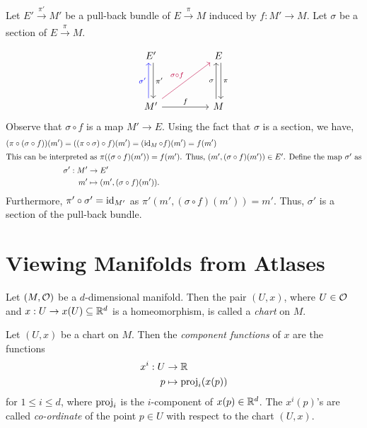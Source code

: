 \begin{remark}
	Let \(E' \xrightarrow[]{\ \pi'\ } M'\) be a pull-back bundle of \(E \xrightarrow[]{\ \pi\ } M\) induced by \(f: M' \to M\). Let \(\sigma\) be a section of \(E \xrightarrow[]{\ \pi\ } M\).
	\begin{equation*}
		\begin{tikzcd}
			E' \arrow[dd, shift left, "\pi'"] & & E \arrow[dd, shift left, "\pi"] \\
			& & \\
			M' \arrow[uu, blue, shift left, "\sigma'"] \arrow[rr, "f"] \arrow[rruu, purple, "\sigma \circ f"] & & M \arrow[uu, shift left, "\sigma"]
		\end{tikzcd}
	\end{equation*}
	Observe that \(\sigma \circ f\) is a map \(M' \to E\). Using the fact that \(\sigma\) is a section, we have,
	\begin{gather}
		(\pi \circ (\sigma \circ f))(m') = ((\pi \circ \sigma) \circ f)(m') = (\operatorname{id}_{M} \circ f)(m') = f(m') \nonumber \\
		\intertext{This can be interpreted as \(\pi((\sigma \circ f)(m')) = f(m')\). Thus, \((m', (\sigma \circ f)(m')) \in E'\). Define the map \(\sigma'\) as}
		\begin{aligned}
			\sigma': M' & \to E'                              \\
			m'          & \mapsto (m', (\sigma \circ f)(m')).
		\end{aligned}
	\end{gather}
	Furthermore, \(\pi' \circ \sigma' = \operatorname{id}_{M'}\) as \(\pi'(m', (\sigma \circ f)(m')) = m'\). Thus, \(\sigma'\) is a section of the pull-back bundle.
\end{remark}

\section{Viewing Manifolds from Atlases}

\begin{definition}[Chart]\label{def:chart}
	Let \((M, \mathcal{O})\) be a \(d\)-dimensional manifold. Then the pair \((U, x)\), where \(U \in \mathcal{O}\) and \(x: U \to x(U) \subseteq \mathbb R^d\) is a homeomorphism, is called a \emph{chart} on \(M\).
\end{definition}

\begin{remark}\label{rem:component-functions}
	Let \((U, x)\) be a chart on \(M\). Then the \emph{component functions} of \(x\) are the functions
	\begin{equation}
		\begin{aligned}
			x^i: U & \to \mathbb R                \\
			p      & \mapsto \operatorname{proj}_i(x(p))
		\end{aligned}
	\end{equation}
	for \(1 \le i \le d\), where \(\operatorname{proj}_i\) is the \(i\)-component of \(x(p) \in \mathbb R^d\). The \(x^i(p)\)'s are called \emph{co-ordinate} of the point \(p \in U\) with respect to the chart \((U, x)\).
\end{remark}


